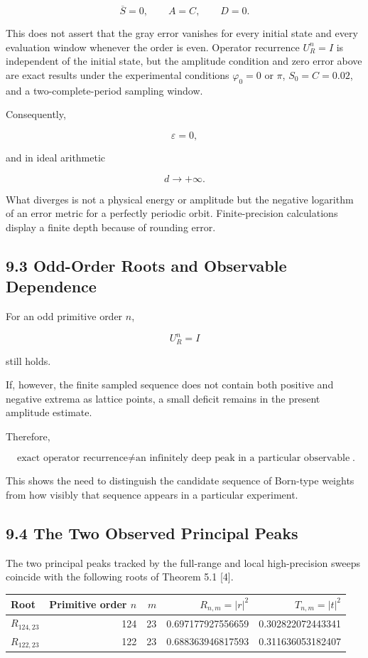 \documentclass[
  a4paper,
  10pt]{article}
\newcounter{none} %
\begin{document}
\[
\overline S=0,
\qquad
A=C,
\qquad
D=0.
\]

This does not assert that the gray error vanishes for every initial
state and every evaluation window whenever the order is even. Operator
recurrence \(U_R^n=I\) is independent of the initial state, but the
amplitude condition and zero error above are exact results under the
experimental conditions \(\varphi_0=0\) or \(\pi\), \(S_0=C=0.02\), and
a two-complete-period sampling window.

Consequently,

\[
\varepsilon=0,
\]

and in ideal arithmetic

\[
d\rightarrow+\infty.
\]

What diverges is not a physical energy or amplitude but the negative
logarithm of an error metric for a perfectly periodic orbit.
Finite-precision calculations display a finite depth because of rounding
error.

\subsection{9.3 Odd-Order Roots and Observable
Dependence}\label{93-odd-order-roots-and-observable-dependence}

For an odd primitive order \(n\),

\[
U_R^n=I
\]

still holds.

If, however, the finite sampled sequence does not contain both positive
and negative extrema as lattice points, a small deficit remains in the
present amplitude estimate.

Therefore,

\[
\boxed{
\text{exact operator recurrence}
\neq
\text{an infinitely deep peak in a particular observable}
}.
\]

This shows the need to distinguish the candidate sequence of Born-type
weights from how visibly that sequence appears in a particular
experiment.

\subsection{9.4 The Two Observed Principal
Peaks}\label{94-the-two-observed-principal-peaks}

The two principal peaks tracked by the full-range and local
high-precision sweeps coincide with the following roots of Theorem 5.1
{[}4{]}.

{\def\LTcaptype{none} %
\begin{longtable}[]{@{}lrrrr@{}}
\toprule\noalign{}
Root & Primitive order \(n\) & \(m\) & \(R_{n,m}=\lvert r\rvert^2\) &
\(T_{n,m}=\lvert t\rvert^2\) \\
\midrule\noalign{}
\endhead
\bottomrule\noalign{}
\endlastfoot
\(R_{124,23}\) & 124 & 23 & 0.697177927556659 & 0.302822072443341 \\
\(R_{122,23}\) & 122 & 23 & 0.688363946817593 & 0.311636053182407 \\
\end{longtable}
}
\end{document}
